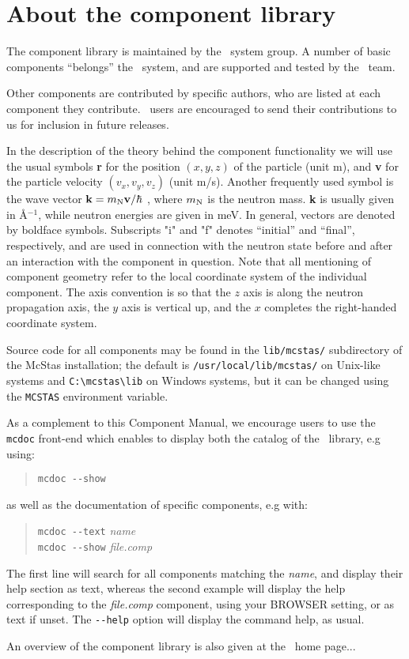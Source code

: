 
\chapter{About the component library}
\label{c:components}
The component library is
maintained by the \MCS\ system group. A number of basic components 
``belongs'' the \MCS\ system, and are supported and tested by the \MCS\
team.

Other components are contributed
by specific authors, who are listed at each component
they contribute.
\MCS\ users are encouraged to send their
contributions to us for inclusion in future releases.

In the description of the theory behind the component functionality 
we will use the usual symbols {\bf r} for the position 
$(x,y,z)$ of the particle (unit m), and {\bf v} for 
the particle velocity $(v_x, v_y, v_z)$ (unit m/s).
Another frequently used symbol is 
the wave vector ${\bf k} = m_{\rm N} {\bf v}/\hbar$ , where
$m_{\rm N}$ is the neutron mass. {\bf k} is usually given in
\AA$^{-1}$, while neutron energies are given in meV.
In general, vectors are denoted by boldface symbols.
Subscripts "i" and "f" denotes ``initial'' and ``final'', respectively,
and are used in connection with the neutron state before and after
an interaction with the component in question.
Note that all mentioning of component geometry refer to
the local coordinate system of the individual component.
The axis convention is so that the $z$ axis is along 
the neutron propagation axis, the $y$ axis is vertical up, 
and the $x$ completes the right-handed coordinate system.

Source code for all components may be found in the \verb+lib/mcstas/+
subdirectory of the McStas installation; 
the default is \verb+/usr/local/lib/mcstas/+ 
on Unix-like systems and \verb+C:\mcstas\lib+ on Windows systems, but it can be
changed using the \verb+MCSTAS+ environment variable. 

As a complement to this Component Manual, we encourage users to use
the \verb+mcdoc+ front-end which enables to display both the 
catalog of the \MCS\ library, e.g using: 
\begin{quote}
  \verb|mcdoc --show|
\end{quote}
as well as the documentation of specific components, e.g with:
\begin{quote}
  \verb|mcdoc --text| {\it name} \\
  \verb|mcdoc --show| {\it file.comp}
\end{quote}
The first line will search for all components matching the {\it name}, 
and display their help section as text, 
whereas the second example will display the help corresponding to 
the {\it file.comp} component, using your 
BROWSER setting, or as text if unset. 
The \verb+--help+ option will display the command help, as usual.

An overview of the component library is also given at the \MCS\ home page...

%
%
%
%
%
%
%
%





